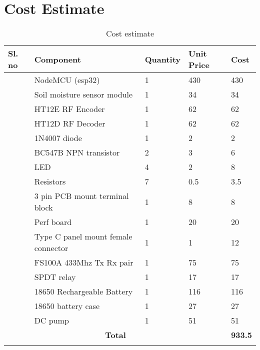 \newpage
\chapter{Cost Estimate}
\renewcommand{\arraystretch}{1.5}

\newcommand\rnum{\stepcounter{tocostnum}\arabic{tocostnum}}

\begin{longtable}[h!]{|l|l|l|l|l|} \hline
	Sl. no & Component                          & Quantity & Unit Price & Cost \\ \hline
	\rnum  & NodeMCU (esp32)                    & 1        & 430        & 430  \\ \hline
	\rnum  & Soil moisture sensor module        & 1        &  34        & 34   \\ \hline
	\rnum  & HT12E RF Encoder                   & 1        &  62        & 62   \\ \hline
	\rnum  & HT12D RF Decoder                   & 1        &  62        & 62   \\ \hline
	\rnum  & 1N4007 diode                       & 1        &   2        & 2    \\ \hline
	\rnum  & BC547B NPN transistor              & 2        &   3        & 6    \\ \hline
	\rnum  & LED                                & 4        &   2        & 8    \\ \hline
	\rnum  & Resistors                          & 7        &   0.5      & 3.5  \\ \hline
	\rnum  & 3 pin PCB mount terminal block     & 1        &   8        & 8    \\ \hline
	\rnum  & Perf board                         & 1        &  20        & 20   \\ \hline
	\rnum  & Type C panel mount female connector& 1        &   1        & 12   \\ \hline
	\rnum  & FS100A 433Mhz Tx Rx pair           & 1        &  75        & 75   \\ \hline
	\rnum  & SPDT relay                         & 1        &  17        & 17   \\ \hline
	\rnum  & 18650 Rechargeable Battery         & 1        & 116        & 116  \\ \hline
	\rnum  & 18650 battery case                 & 1        &  27        & 27   \\ \hline
	\rnum  & DC pump                            & 1        &  51        & 51   \\ \hline
	\multicolumn{4}{|c|}{\textbf{Total}}& \textbf{933.5} \\ \hline
	\caption{Cost estimate}
\end{longtable}

